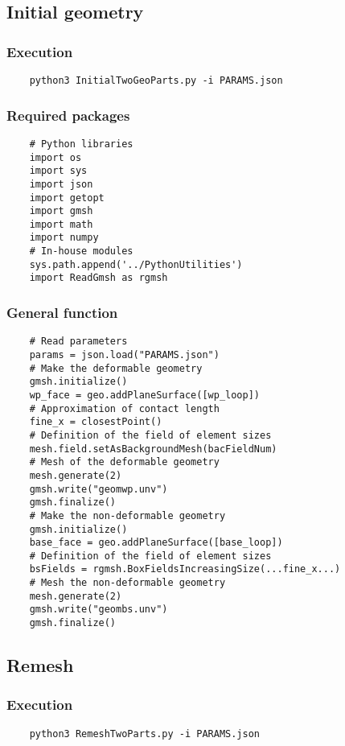 \documentclass{article}
\begin{document}
\subsection{Initial geometry}
\subsubsection{Execution}
\begin{verbatim}
    python3 InitialTwoGeoParts.py -i PARAMS.json
\end{verbatim}
\subsubsection{Required packages}
\begin{verbatim}
    # Python libraries
    import os
    import sys
    import json
    import getopt
    import gmsh
    import math
    import numpy
    # In-house modules
    sys.path.append('../PythonUtilities')
    import ReadGmsh as rgmsh
\end{verbatim}
\subsubsection{General function}
\begin{verbatim}
    # Read parameters
    params = json.load("PARAMS.json")
    # Make the deformable geometry
    gmsh.initialize()
    wp_face = geo.addPlaneSurface([wp_loop])
    # Approximation of contact length
    fine_x = closestPoint()
    # Definition of the field of element sizes
    mesh.field.setAsBackgroundMesh(bacFieldNum)
    # Mesh of the deformable geometry
    mesh.generate(2)
    gmsh.write("geomwp.unv")
    gmsh.finalize()
    # Make the non-deformable geometry
    gmsh.initialize()
    base_face = geo.addPlaneSurface([base_loop])
    # Definition of the field of element sizes
    bsFields = rgmsh.BoxFieldsIncreasingSize(...fine_x...)
    # Mesh the non-deformable geometry
    mesh.generate(2)
    gmsh.write("geombs.unv")
    gmsh.finalize()
\end{verbatim}

\subsection{Remesh}
\subsubsection{Execution}
\begin{verbatim}
    python3 RemeshTwoParts.py -i PARAMS.json
\end{verbatim}
\end{document}
